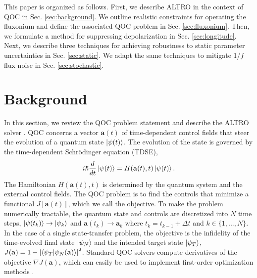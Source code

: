 \documentclass[
  amsfonts,
  amsmath,
  amssymb,
  pra,
  twocolumn,
  superscriptaddress,
]{revtex4-2}
\begin{document}
This paper is organized as follows.
First, we describe ALTRO in the context of QOC
in Sec. \ref{sec:background}.
We outline realistic constraints for operating the fluxonium and
define the associated QOC problem in Sec. \ref{sec:fluxonium}.
Then, we formulate a method for suppressing depolarization
in Sec. \ref{sec:longitude}. Next, we describe three techniques for achieving
robustness to static parameter uncertainties in Sec. \ref{sec:static}. We
adapt the same techniques to mitigate 1/$f$ flux noise
in Sec. \ref{sec:stochastic}.

\section{Background \label{sec:background}}
In this section, we
review the QOC problem statement
and describe the ALTRO solver \cite{howell2019altro}.
QOC concerns a vector $\mathbf{a}(t)$ of time-dependent control fields
that steer the evolution of a quantum state $\ket{\psi(t)}$.
The evolution of the state is governed by the time-dependent
Schr{\"o}dinger equation (TDSE),
\begin{equation}
  i \hbar \frac{d}{dt} \ket{\psi(t)} = H(\mathbf{a}(t), t) \ket{\psi(t)}.
  \label{eq:tdse}
\end{equation}
The Hamiltonian $H(\mathbf{a}(t), t)$ is determined by the quantum system and the external control fields.
The QOC problem is to find the
controls that minimize a functional $J[\mathbf{a}(t)]$,
which we call the objective.
To make the problem numerically tractable,
the quantum state and controls are discretized into $N$ time steps,
$\ket{\psi(t_{k})} \to \ket{\psi_k}$ and $\mathbf{a}(t_{k}) \to \mathbf{a}_k$ where
$t_{k} = t_{k - 1} + \Delta t$ and $k \in \{1, ..., N\}$.
In the case of a single state-transfer problem, the objective is
the infidelity of the time-evolved final state $\ket{\psi_N}$ and
the intended target state $\ket{\psi_T}$,
$J(\mathbf{a}) = 1 - {\lvert \braket{\psi_{T}}{\psi_{N}(\mathbf{a})} \rvert}^{2}$.
Standard QOC solvers compute derivatives of the objective $\nabla J(\mathbf{a})$,
which can easily be used to implement first-order optimization methods
\cite{machnes2015tunable, khaneja2005optimal, leung2017speedup, goerz2019krotov}.
\end{document}
